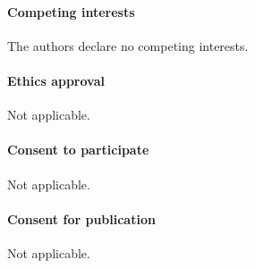 \paragraph{\large Competing interests}
The authors declare no competing interests.

\vspace{-1em}
\paragraph{\large Ethics approval}
Not applicable.

\vspace{-1em}
\paragraph{\large Consent to participate}
Not applicable.

\vspace{-1em}
\paragraph{\large Consent for publication}
Not applicable.

